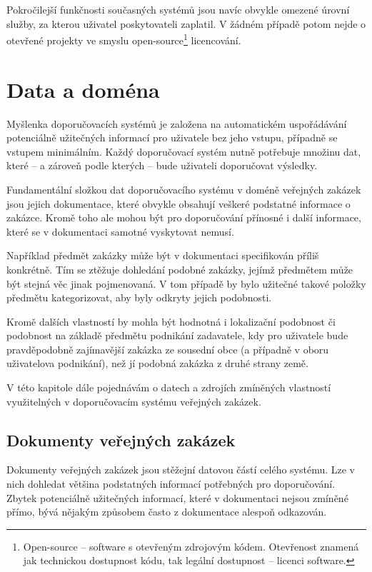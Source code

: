 \documentclass[thesis=M,czech]{FITthesis}[2019/12/23]
\begin{document}
Pokročilejší funkčnosti současných systémů jsou navíc obvykle omezené úrovní služby, za kterou uživatel poskytovateli zaplatil. V žádném případě potom nejde o otevřené projekty ve smyslu open-source\footnote{Open-source -- software s otevřeným zdrojovým kódem. Otevřenost znamená jak technickou dostupnost kódu, tak legální dostupnost – licenci software\cite{wikiOS}.} licencování.


\chapter{Data a doména}
Myšlenka doporučovacích systémů je založena na automatickém uspořádávání potenciálně užitečných informací pro uživatele bez jeho vstupu, případně se vstupem minimálním. Každý doporučovací systém nutně potřebuje množinu dat, které -- a zároveň podle kterých -- bude uživateli doporučovat výsledky.

Fundamentální složkou dat doporučovacího systému v doméně veřejných zakázek jsou jejich dokumentace, které obvykle obsahují veškeré podstatné informace o zakázce. Kromě toho ale mohou být pro doporučování přínosné i další informace, které se v dokumentaci samotné vyskytovat nemusí.

Například předmět zakázky může být v dokumentaci specifikován příliš konkrétně. Tím se ztěžuje dohledání podobné zakázky, jejímž předmětem může být stejná věc jinak pojmenovaná. V tom případě by bylo užitečné takové položky předmětu kategorizovat, aby byly odkryty jejich podobnosti.

Kromě dalších vlastností by mohla být hodnotná i lokalizační podobnost či podobnost na základě předmětu podnikání zadavatele, kdy pro uživatele bude pravděpodobně zajímavější zakázka ze sousední obce (a případně v oboru uživatelova podnikání), než jí podobná zakázka z druhé strany země.

V této kapitole dále pojednávám o datech a zdrojích zmíněných vlastností využitelných v doporučovacím systému veřejných zakázek.

\section{Dokumenty veřejných zakázek}
\label{data&domain_dokumenty_vz}

Dokumenty veřejných zakázek jsou stěžejní datovou částí celého systému. Lze v nich dohledat většina podstatných informací potřebných pro doporučování. Zbytek potenciálně užitečných informací, které v dokumentaci nejsou zmíněné přímo, bývá nějakým způsobem často z dokumentace alespoň odkazován.
\end{document}
